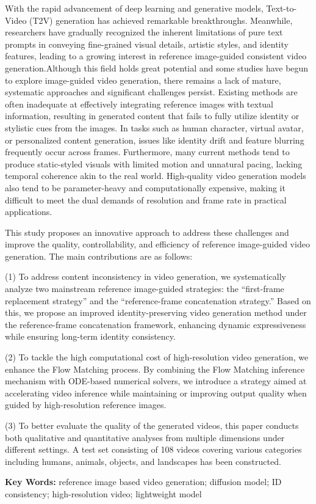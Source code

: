 With the rapid advancement of deep learning and generative models, Text-to-Video (T2V) generation has achieved remarkable breakthroughs. Meanwhile, researchers have gradually recognized the inherent limitations of pure text prompts in conveying fine-grained visual details, artistic styles, and identity features, leading to a growing interest in reference image-guided consistent video generation.Although this field holds great potential and some studies have begun to explore image-guided video generation, there remains a lack of mature, systematic approaches and significant challenges persist. Existing methods are often inadequate at effectively integrating reference images with textual information, resulting in generated content that fails to fully utilize identity or stylistic cues from the images. In tasks such as human character, virtual avatar, or personalized content generation, issues like identity drift and feature blurring frequently occur across frames. Furthermore, many current methods tend to produce static-styled visuals with limited motion and unnatural pacing, lacking temporal coherence akin to the real world. High-quality video generation models also tend to be parameter-heavy and computationally expensive, making it difficult to meet the dual demands of resolution and frame rate in practical applications.

This study proposes an innovative approach to address these challenges and improve the quality, controllability, and efficiency of reference image-guided video generation. The main contributions are as follows:

(1) To address content inconsistency in video generation, we systematically analyze two mainstream reference image-guided strategies: the “first-frame replacement strategy” and the “reference-frame concatenation strategy.” Based on this, we propose an improved identity-preserving video generation method under the reference-frame concatenation framework, enhancing dynamic expressiveness while ensuring long-term identity consistency.

(2) To tackle the high computational cost of high-resolution video generation, we enhance the Flow Matching process. By combining the Flow Matching inference mechanism with ODE-based numerical solvers, we introduce a strategy aimed at accelerating video inference while maintaining or improving output quality when guided by high-resolution reference images.

(3) To better evaluate the quality of the generated videos, this paper conducts both qualitative and quantitative analyses from multiple dimensions under different settings. A test set consisting of 108 videos covering various categories including humans, animals, objects, and landscapes has been constructed.

\vspace{0.5cm} %

\noindent
\textbf{Key Words: }reference image based video generation; diffusion model; ID consistency; high-resolution video; lightweight model

